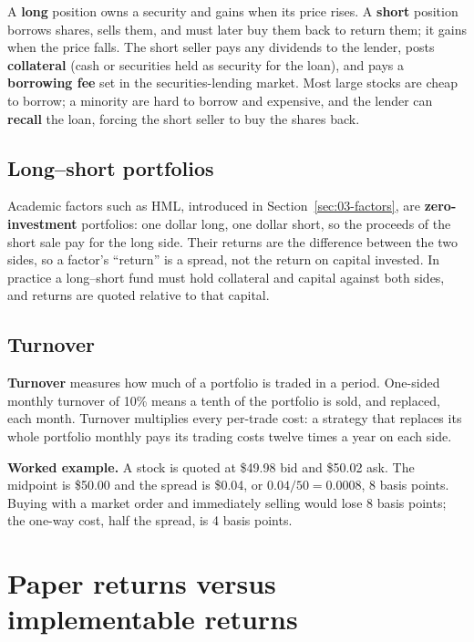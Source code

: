 A \textbf{long} position owns a security and gains when its price rises. A \textbf{short} position borrows shares, sells them, and must later buy them back to return them; it gains when the price falls. The short seller pays any dividends to the lender, posts \textbf{collateral} (cash or securities held as security for the loan), and pays a \textbf{borrowing fee} set in the securities-lending market. Most large stocks are cheap to borrow; a minority are hard to borrow and expensive, and the lender can \textbf{recall} the loan, forcing the short seller to buy the shares back.

\subsection{Long--short portfolios}

Academic factors such as HML, introduced in Section~\ref{sec:03-factors}, are \textbf{zero-investment} portfolios: one dollar long, one dollar short, so the proceeds of the short sale pay for the long side. Their returns are the difference between the two sides, so a factor's ``return'' is a spread, not the return on capital invested. In practice a long--short fund must hold collateral and capital against both sides, and returns are quoted relative to that capital.

\subsection{Turnover}

\textbf{Turnover} measures how much of a portfolio is traded in a period. One-sided monthly turnover of 10\% means a tenth of the portfolio is sold, and replaced, each month. Turnover multiplies every per-trade cost: a strategy that replaces its whole portfolio monthly pays its trading costs twelve times a year on each side.

\textbf{Worked example.} A stock is quoted at \$49.98 bid and \$50.02 ask. The midpoint is \$50.00 and the spread is \$0.04, or $0.04/50 = 0.0008$, 8 basis points. Buying with a market order and immediately selling would lose 8 basis points; the one-way cost, half the spread, is 4 basis points.

\section{Paper returns versus implementable returns}
\label{sec:06-paper}

